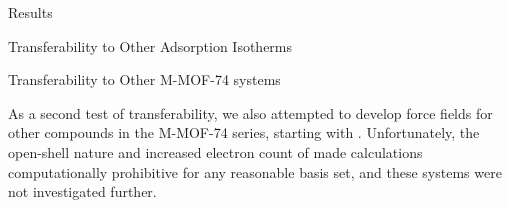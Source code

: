\begin{section}{Results}
\begin{subsection}{Transferability to Other Adsorption Isotherms}
\end{subsection}
\begin{subsection}{Transferability to Other M-MOF-74 systems}

As a second test of transferability, we also attempted to develop force fields
for other compounds in the M-MOF-74 series, starting with \comof.
Unfortunately, the open-shell nature and increased electron count of \comof
made \lmoeda calculations computationally prohibitive for any reasonable basis
set, and these systems were not investigated further.

\end{subsection}


\end{section}
